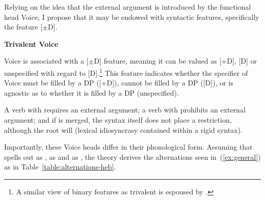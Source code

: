 \begin{exe}
\begin{xlist}
\begin{exe}
\begin{exe}
\begin{exe}
\begin{exe}
\begin{xlist}
\begin{exe}
\begin{xlist}
\begin{xlist}
\begin{xlist}
\begin{exe}
\begin{xlist}
\begin{exe}
\begin{exe}
\begin{xlist}
\begin{exe}
\begin{xlist}
\begin{exe}
\begin{exe}
\begin{xlist}
\begin{exe}
\begin{xlist}
\begin{exe}
\begin{xlist}
\begin{exe}
\begin{exe}
\begin{xlist}
\begin{exe}
\begin{exe}
\begin{xlist}
\begin{exe}
\begin{xlist}
\begin{exe}
\begin{xlist}
\begin{xlist}
\begin{exe}
\begin{exe}
\begin{xlist}
\begin{exe}
\begin{xlist}
\begin{exe}
\begin{xlist}
Relying on the idea that the external argument is introduced by the functional head Voice, I propose that it may be endowed with syntactic features, specifically the feature [$\pm$D].
 \begin{exe}
 \ex  \textbf{Trivalent Voice} 
 \begin{xlist} 
 	\ex  Voice is associated with a [$\pm$D] feature, meaning it can be valued as [+D], [\textminus{}D] or unspecified with regard to [D].\footnote{A similar view of binary features as trivalent is espoused by \cite{harbour11}.} 
 	\ex  This feature indicates whether the specifier of Voice must be filled by a DP ([+D]), cannot be filled by a DP ([\textminus{}D]), or is agnostic as to whether it is filled by a DP (unspecified). 
 \z
\z 

A verb with {\vd} requires an external argument; a verb with {\vz} prohibits an external argument; and if  is merged, the syntax itself does not place a restriction, although the root will (lexical idiosyncrasy contained within a rigid syntax).

Importantly, these Voice heads differ in their phonological form. Assuming that {\vd} spells out as {\thif}, {\vz} as {\tnif} and  as {\tkal}, the theory derives the alternations seen in~(\ref{ex:general}) as in Table~\ref{table:alternations-heb}.


\end{xlist}
\end{exe}
\end{xlist}
\end{exe}
\end{xlist}
\end{exe}
\end{xlist}
\end{exe}
\end{exe}
\end{xlist}
\end{xlist}
\end{exe}
\end{xlist}
\end{exe}
\end{xlist}
\end{exe}
\end{exe}
\end{xlist}
\end{exe}
\end{exe}
\end{xlist}
\end{exe}
\end{xlist}
\end{exe}
\end{xlist}
\end{exe}
\end{exe}
\end{xlist}
\end{exe}
\end{xlist}
\end{exe}
\end{exe}
\end{xlist}
\end{exe}
\end{xlist}
\end{xlist}
\end{xlist}
\end{exe}
\end{xlist}
\end{exe}
\end{exe}
\end{exe}
\end{exe}
\end{xlist}
\end{exe}

